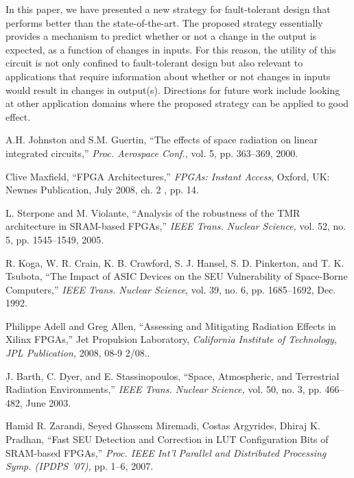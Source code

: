 \documentclass[10pt,journal,cspaper,compsoc]{IEEEtran}
\begin{document}
{{In this paper, we have presented a new strategy for fault-tolerant design that performs better than the state-of-the-art. The proposed strategy essentially provides a mechanism to predict whether or not a change in the output is expected, as a function of changes in inputs. For this reason, the utility of this circuit is not only confined to fault-tolerant design but also relevant to applications that require information about whether or not changes in inputs would result in changes in output(s). Directions for future work include looking at other application domains where the proposed strategy can be applied to good effect.



\ifCLASSOPTIONcaptionsoff
  \newpage
\fi



\begin{thebibliography}{1}



A.H. Johnston and S.M. Guertin, ``The effects of space radiation on linear integrated circuits,'' \textit{Proc. Aerospace Conf.,} vol. 5, pp. 363--369, 2000.

Clive Maxfield, ``FPGA Architectures,'' \textit{FPGAs: Instant Access}, Oxford, UK: Newnes Publication, July 2008, ch. 2 , pp. 14.


L. Sterpone and M. Violante, ``Analysis of the robustness of the TMR architecture in SRAM-based FPGAs,'' \textit{IEEE Trans. Nuclear Science,} vol. 52, no. 5, pp. 1545--1549, 2005.

R. Koga, W. R. Crain, K. B. Crawford, S. J. Hansel, S. D. Pinkerton, and T. K. Tsubota, ``The Impact of ASIC Devices on the SEU Vulnerability of Space-Borne Computers,''  \textit{IEEE Trans. Nuclear Science}, vol. 39, no. 6, pp. 1685--1692, Dec. 1992.

Philippe Adell and Greg Allen, ``Assessing and Mitigating Radiation Effects in Xilinx FPGAs,'' Jet Propulsion Laboratory, \textit{California Institute of Technology, JPL Publication,} 2008, 08-9 2/08..


J. Barth, C. Dyer, and E. Stassinopoulos, ``Space, Atmospheric, and Terrestrial Radiation Environments,'' \textit{IEEE Trans. Nuclear Science,} vol. 50, no. 3, pp. 466--482, June 2003.

Hamid R. Zarandi, Seyed Ghassem Miremadi, Costas Argyrides, Dhiraj K. Pradhan, ``\textcolor{black}{Fast} SEU Detection and Correction in LUT Configuration Bits of SRAM-based FPGAs,''  \textit{Proc. IEEE Int'l Parallel and Distributed Processing Symp. (IPDPS '07),} pp. 1--6, 2007.


\end{thebibliography}}}
\end{document}
